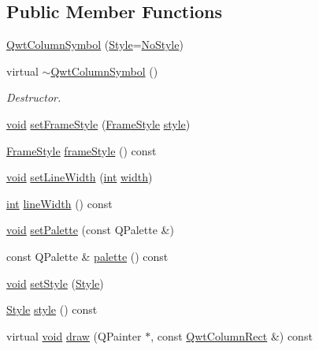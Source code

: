 \subsection*{Public Member Functions}
\begin{DoxyCompactItemize}
\item 
\hyperlink{class_qwt_column_symbol_a78d6b04908f7f814cdc07c3ae704b329}{Qwt\-Column\-Symbol} (\hyperlink{class_qwt_column_symbol_aaace508375eef3ee23ed6c47b1d65ef2}{Style}=\hyperlink{class_qwt_column_symbol_aaace508375eef3ee23ed6c47b1d65ef2a3c16d900e0dcfc18f174f4120136cb5b}{No\-Style})
\item 
virtual \hyperlink{class_qwt_column_symbol_a4ca8a7cb15c23be659f3bdcdb50ae20c}{$\sim$\-Qwt\-Column\-Symbol} ()
\begin{DoxyCompactList}\small\item\em Destructor. \end{DoxyCompactList}\item 
\hyperlink{group___u_a_v_objects_plugin_ga444cf2ff3f0ecbe028adce838d373f5c}{void} \hyperlink{class_qwt_column_symbol_a80826051d63efaf033868f05404ef565}{set\-Frame\-Style} (\hyperlink{class_qwt_column_symbol_a4b97f7748370447559a11a5adeb70e44}{Frame\-Style} \hyperlink{class_qwt_column_symbol_a3cf6f4e696a6df0936160d6bdb8e6b25}{style})
\item 
\hyperlink{class_qwt_column_symbol_a4b97f7748370447559a11a5adeb70e44}{Frame\-Style} \hyperlink{class_qwt_column_symbol_a9e13ae8a8b07556ee2de672c7067606a}{frame\-Style} () const 
\item 
\hyperlink{group___u_a_v_objects_plugin_ga444cf2ff3f0ecbe028adce838d373f5c}{void} \hyperlink{class_qwt_column_symbol_af9348444ae2c21d3bcaff3217fc694fc}{set\-Line\-Width} (\hyperlink{ioapi_8h_a787fa3cf048117ba7123753c1e74fcd6}{int} \hyperlink{glext_8h_a76aaa5c50746272e7d2de9aece921757}{width})
\item 
\hyperlink{ioapi_8h_a787fa3cf048117ba7123753c1e74fcd6}{int} \hyperlink{class_qwt_column_symbol_afe6850ba90ade0fdf61edd203e49206d}{line\-Width} () const 
\item 
\hyperlink{group___u_a_v_objects_plugin_ga444cf2ff3f0ecbe028adce838d373f5c}{void} \hyperlink{class_qwt_column_symbol_a7d2b17a4b8aef7ae098fd42bc663527b}{set\-Palette} (const Q\-Palette \&)
\item 
const Q\-Palette \& \hyperlink{class_qwt_column_symbol_afe13154e29f882e77fedf8bbc3280f7e}{palette} () const 
\item 
\hyperlink{group___u_a_v_objects_plugin_ga444cf2ff3f0ecbe028adce838d373f5c}{void} \hyperlink{class_qwt_column_symbol_a3e2c72514fdc2e857ee2a34bc9f96e93}{set\-Style} (\hyperlink{class_qwt_column_symbol_aaace508375eef3ee23ed6c47b1d65ef2}{Style})
\item 
\hyperlink{class_qwt_column_symbol_aaace508375eef3ee23ed6c47b1d65ef2}{Style} \hyperlink{class_qwt_column_symbol_a3cf6f4e696a6df0936160d6bdb8e6b25}{style} () const 
\item 
virtual \hyperlink{group___u_a_v_objects_plugin_ga444cf2ff3f0ecbe028adce838d373f5c}{void} \hyperlink{class_qwt_column_symbol_a647960f89c1f2f8524789d7ad90482d8}{draw} (Q\-Painter $\ast$, const \hyperlink{class_qwt_column_rect}{Qwt\-Column\-Rect} \&) const 
\end{DoxyCompactItemize}
